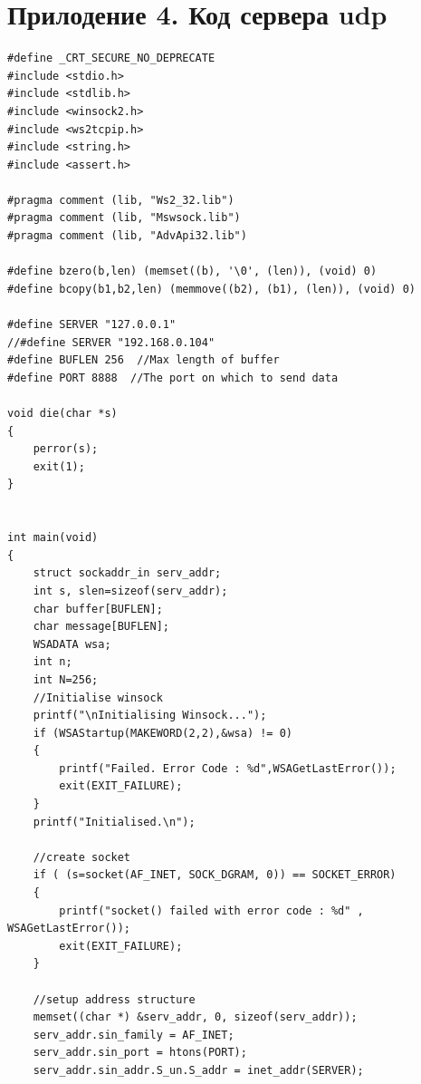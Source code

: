 \documentclass[10pt,a4paper]{report}
\begin{document}
\section{Прилодение 4. Код сервера udp}
\begin{verbatim}
#define _CRT_SECURE_NO_DEPRECATE
#include <stdio.h>
#include <stdlib.h>
#include <winsock2.h>
#include <ws2tcpip.h>
#include <string.h>
#include <assert.h>

#pragma comment (lib, "Ws2_32.lib")
#pragma comment (lib, "Mswsock.lib")
#pragma comment (lib, "AdvApi32.lib")

#define bzero(b,len) (memset((b), '\0', (len)), (void) 0)  
#define bcopy(b1,b2,len) (memmove((b2), (b1), (len)), (void) 0)

#define SERVER "127.0.0.1"
//#define SERVER "192.168.0.104"
#define BUFLEN 256  //Max length of buffer
#define PORT 8888  //The port on which to send data

void die(char *s)
{
    perror(s);
    exit(1);
}


int main(void)
{
    struct sockaddr_in serv_addr;
    int s, slen=sizeof(serv_addr);
    char buffer[BUFLEN];
    char message[BUFLEN];
    WSADATA wsa;
	int n;
	int N=256;
    //Initialise winsock
    printf("\nInitialising Winsock...");
    if (WSAStartup(MAKEWORD(2,2),&wsa) != 0)
    {
        printf("Failed. Error Code : %d",WSAGetLastError());
        exit(EXIT_FAILURE);
    }
    printf("Initialised.\n");
     
    //create socket
    if ( (s=socket(AF_INET, SOCK_DGRAM, 0)) == SOCKET_ERROR)
    {
        printf("socket() failed with error code : %d" , WSAGetLastError());
        exit(EXIT_FAILURE);
    }
     
    //setup address structure
    memset((char *) &serv_addr, 0, sizeof(serv_addr));
    serv_addr.sin_family = AF_INET;
    serv_addr.sin_port = htons(PORT);
    serv_addr.sin_addr.S_un.S_addr = inet_addr(SERVER);


\end{verbatim}
\end{document}
